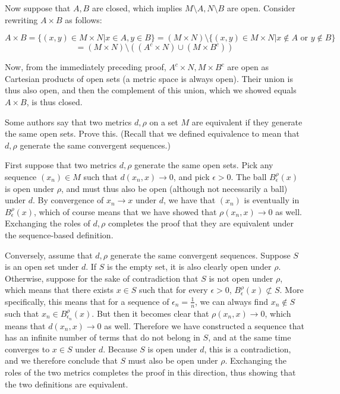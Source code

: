 \begin{solution}
    Now suppose that $A, B$ are closed, which implies $M \setminus A, N \setminus B$ are open.
    Consider rewriting $A \times B$ as follows:

    $$A \times B = \{(x, y) \in M \times N \lvert x \in A, y \in B\} = (M \times N) \setminus \{(x, y) \in M \times N \lvert x \notin A \text{ or } y \notin B\}$$
    $$ = (M \times N) \setminus ((A^{c} \times N) \cup (M \times B^{c}))$$

    Now, from the immediately preceding proof, $A^{c} \times N, M \times B^{c}$ are open as Cartesian products of open sets (a metric space is always open).
    Their union is thus also open, and then the complement of this union, which we showed equals $A \times B$, is thus closed.
\end{solution}

\newpage

\begin{exercise}{3}
    Some authors say that two metrics $d, \rho$ on a set $M$ are equivalent if they generate the same open sets.
    Prove this.
    (Recall that we defined equivalence to mean that $d, \rho$ generate the same convergent sequences.)
\end{exercise}

\begin{solution}
    
    First suppose that two metrics $d, \rho$ generate the same open sets.
    Pick any sequence $(x_n) \in M$ such that $d(x_n, x) \rightarrow 0$, and pick $\epsilon > 0$.
    The ball $B_{\epsilon}^{\rho}(x)$ is open under $\rho$, and must thus also be open (although not necessarily a ball) under $d$.
    By convergence of $x_n \rightarrow x$ under $d$, we have that $(x_n)$ is eventually in $B_{\epsilon}^{\rho}(x)$, which of course means that we have showed that $\rho(x_n, x) \rightarrow 0$ as well.
    Exchanging the roles of $d, \rho$ completes the proof that they are equivalent under the sequence-based definition.

    Conversely, assume that $d, \rho$ generate the same convergent sequences.
    Suppose $S$ is an open set under $d$.
    If $S$ is the empty set, it is also clearly open under $\rho$.
    Otherwise, suppose for the sake of contradiction that $S$ is not open under $\rho$, which means that there exists $x \in S$ such that for every $\epsilon > 0$, $B_{\epsilon}^{\rho}(x) \not\subset S$.
    More specifically, this means that for a sequence of $\epsilon_n = \frac{1}{n}$, we can always find $x_n \notin S$ such that $x_n \in B_{\epsilon_n}^{\rho}(x)$.
    But then it becomes clear that $\rho(x_n, x) \rightarrow 0$, which means that $d(x_n, x) \rightarrow 0$ as well.
    Therefore we have constructed a sequence that has an infinite number of terms that do not belong in $S$, and at the same time converges to $x \in S$ under $d$.
    Because $S$ is open under $d$, this is a contradiction, and we therefore conclude that $S$ must also be open under $\rho$.
    Exchanging the roles of the two metrics completes the proof in this direction, thus showing that the two definitions are equivalent.
\end{solution}

